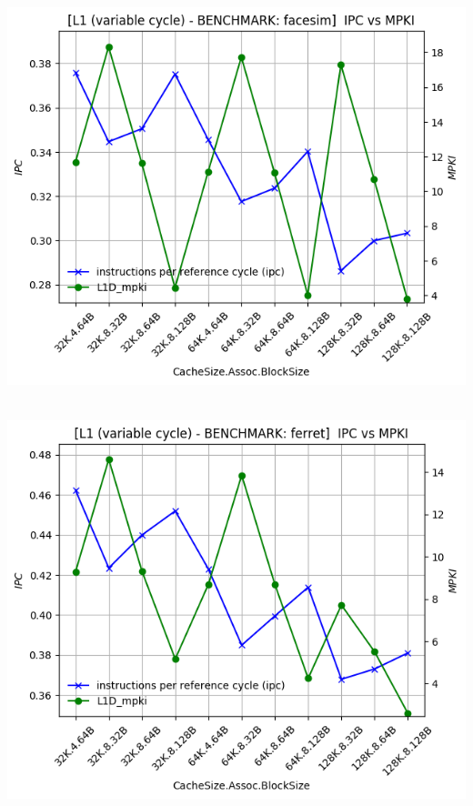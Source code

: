 \begin{minipage}{\textwidth}
    \begin{center}
        \\
        \vspace{3mm}
        \includegraphics[scale=0.65]{graphs/L1/var/facesim.png}
        \vspace{6mm}
    \end{center}
\end{minipage}

\begin{minipage}{\textwidth}
    \begin{center}
        \\
        \vspace{3mm}
        \includegraphics[scale=0.65]{graphs/L1/var/ferret.png}
        \vspace{6mm}
    \end{center}
\end{minipage}


